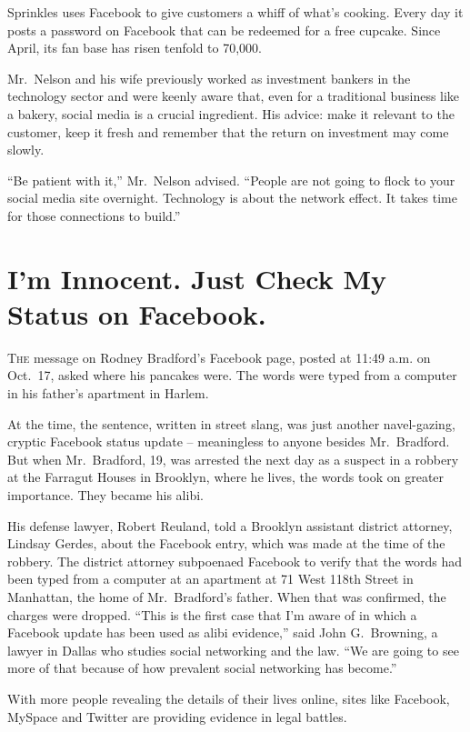 ﻿\documentclass[12pt]{article}
\begin{document}
Sprinkles uses Facebook to give customers a whiff of what's cooking. Every day it posts a password
on Facebook that can be redeemed for a free cupcake. Since April, its fan base has risen tenfold to
70,000.

Mr.~Nelson and his wife previously worked as investment bankers in the technology sector and were
keenly aware that, even for a traditional business like a bakery, social media is a crucial
ingredient. His advice: make it relevant to the customer, keep it fresh and remember that the return
on investment may come slowly.

``Be patient with it,'' Mr.~Nelson advised. ``People are not going to flock to your social media
site overnight. Technology is about the network effect. It takes time for those connections to
build.''

\section{I'm Innocent. Just Check My Status on Facebook.}

\lettrine{T}{he} message on Rodney Bradford's Facebook page, posted at 11:49
a.m. on Oct.~17, asked where his pancakes were. The words were typed from a computer in his father's
apartment in Harlem.

At the time, the sentence, written in street slang, was just another navel-gazing, cryptic Facebook
status update -- meaningless to anyone besides Mr.~Bradford. But when Mr.~Bradford, 19, was arrested
the next day as a suspect in a robbery at the Farragut Houses in Brooklyn, where he lives, the words
took on greater importance. They became his alibi.

His defense lawyer, Robert Reuland, told a Brooklyn assistant district attorney, Lindsay Gerdes,
about the Facebook entry, which was made at the time of the robbery. The district attorney
subpoenaed Facebook to verify that the words had been typed from a computer at an apartment at 71
West 118th Street in Manhattan, the home of Mr.~Bradford's father. When that was confirmed, the
charges were dropped. ``This is the first case that I'm aware of in which a Facebook update has been
used as alibi evidence,'' said John G.~Browning, a lawyer in Dallas who studies social networking
and the law. ``We are going to see more of that because of how prevalent social networking has
become.''

With more people revealing the details of their lives online, sites like Facebook, MySpace and
Twitter are providing evidence in legal battles.
\end{document}
